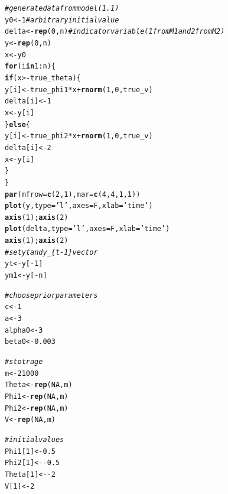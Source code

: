 \documentclass[12pt]{article}\usepackage[]{graphicx}\usepackage[]{color}
\makeatletter
\newcommand{\hlnum}[1]{\textcolor[rgb]{0.686,0.059,0.569}{#1}}%
\newcommand{\hlstr}[1]{\textcolor[rgb]{0.192,0.494,0.8}{#1}}%
\newcommand{\hlcom}[1]{\textcolor[rgb]{0.678,0.584,0.686}{\textit{#1}}}%
\newcommand{\hlopt}[1]{\textcolor[rgb]{0,0,0}{#1}}%
\newcommand{\hlstd}[1]{\textcolor[rgb]{0.345,0.345,0.345}{#1}}%
\newcommand{\hlkwa}[1]{\textcolor[rgb]{0.161,0.373,0.58}{\textbf{#1}}}%
\newcommand{\hlkwb}[1]{\textcolor[rgb]{0.69,0.353,0.396}{#1}}%
\newcommand{\hlkwc}[1]{\textcolor[rgb]{0.333,0.667,0.333}{#1}}%
\newcommand{\hlkwd}[1]{\textcolor[rgb]{0.737,0.353,0.396}{\textbf{#1}}}%
\newenvironment{kframe}{%
 \def\at@end@of@kframe{}%
 \ifinner\ifhmode%
  \def\at@end@of@kframe{\end{minipage}}%
  \begin{minipage}{\columnwidth}%
 \fi\fi%
 \def\FrameCommand##1{\hskip\@totalleftmargin \hskip-\fboxsep
 \colorbox{shadecolor}{##1}\hskip-\fboxsep
     \hskip-\linewidth \hskip-\@totalleftmargin \hskip\columnwidth}%
 \MakeFramed {\advance\hsize-\width
   \@totalleftmargin\z@ \linewidth\hsize
   \@setminipage}}%
 {\par\unskip\endMakeFramed%
 \at@end@of@kframe}
\newenvironment{knitrout}{}{} %
\makeatother
\begin{document}
\begin{knitrout}
\begin{kframe}
\begin{alltt}
\hlcom{# generate data from model (1.1)}
\hlstd{y0} \hlkwb{<-} \hlnum{1}  \hlcom{# arbitrary initial value}
\hlstd{delta} \hlkwb{<-} \hlkwd{rep}\hlstd{(}\hlnum{0}\hlstd{, n)}  \hlcom{# indicator variable (1 from M1 and 2 from M2)}
\hlstd{y} \hlkwb{<-} \hlkwd{rep}\hlstd{(}\hlnum{0}\hlstd{, n)}
\hlstd{x} \hlkwb{<-} \hlstd{y0}
\hlkwa{for} \hlstd{(i} \hlkwa{in} \hlnum{1}\hlopt{:}\hlstd{n) \{}
    \hlkwa{if} \hlstd{(x} \hlopt{> -}\hlstd{true_theta) \{}
        \hlstd{y[i]} \hlkwb{<-} \hlstd{true_phi1} \hlopt{*} \hlstd{x} \hlopt{+} \hlkwd{rnorm}\hlstd{(}\hlnum{1}\hlstd{,} \hlnum{0}\hlstd{, true_v)}
        \hlstd{delta[i]} \hlkwb{<-} \hlnum{1}
        \hlstd{x} \hlkwb{<-} \hlstd{y[i]}
    \hlstd{\}} \hlkwa{else} \hlstd{\{}
        \hlstd{y[i]} \hlkwb{<-} \hlstd{true_phi2} \hlopt{*} \hlstd{x} \hlopt{+} \hlkwd{rnorm}\hlstd{(}\hlnum{1}\hlstd{,} \hlnum{0}\hlstd{, true_v)}
        \hlstd{delta[i]} \hlkwb{<-} \hlnum{2}
        \hlstd{x} \hlkwb{<-} \hlstd{y[i]}
    \hlstd{\}}
\hlstd{\}}
\hlkwd{par}\hlstd{(}\hlkwc{mfrow} \hlstd{=} \hlkwd{c}\hlstd{(}\hlnum{2}\hlstd{,} \hlnum{1}\hlstd{),} \hlkwc{mar} \hlstd{=} \hlkwd{c}\hlstd{(}\hlnum{4}\hlstd{,} \hlnum{4}\hlstd{,} \hlnum{1}\hlstd{,} \hlnum{1}\hlstd{))}
\hlkwd{plot}\hlstd{(y,} \hlkwc{type} \hlstd{=} \hlstr{'l'}\hlstd{,} \hlkwc{axes} \hlstd{= F,} \hlkwc{xlab} \hlstd{=} \hlstr{'time'}\hlstd{)}
\hlkwd{axis}\hlstd{(}\hlnum{1}\hlstd{);} \hlkwd{axis}\hlstd{(}\hlnum{2}\hlstd{)}
\hlkwd{plot}\hlstd{(delta,} \hlkwc{type} \hlstd{=} \hlstr{'l'}\hlstd{,} \hlkwc{axes} \hlstd{= F,} \hlkwc{xlab} \hlstd{=} \hlstr{'time'}\hlstd{)}
\hlkwd{axis}\hlstd{(}\hlnum{1}\hlstd{);} \hlkwd{axis}\hlstd{(}\hlnum{2}\hlstd{)}
\hlcom{# set yt and y_\{t-1\} vector}
\hlstd{yt} \hlkwb{<-} \hlstd{y[}\hlopt{-}\hlnum{1}\hlstd{]}
\hlstd{ym1} \hlkwb{<-} \hlstd{y[}\hlopt{-}\hlstd{n]}

\hlcom{# choose prior parameters}
\hlstd{c} \hlkwb{<-} \hlnum{1}
\hlstd{a} \hlkwb{<-} \hlnum{3}
\hlstd{alpha0} \hlkwb{<-} \hlnum{3}
\hlstd{beta0} \hlkwb{<-} \hlnum{0.003}

\hlcom{# stotrage}
\hlstd{m} \hlkwb{<-} \hlnum{21000}
\hlstd{Theta} \hlkwb{<-} \hlkwd{rep}\hlstd{(}\hlnum{NA}\hlstd{, m)}
\hlstd{Phi1} \hlkwb{<-} \hlkwd{rep}\hlstd{(}\hlnum{NA}\hlstd{, m)}
\hlstd{Phi2} \hlkwb{<-} \hlkwd{rep}\hlstd{(}\hlnum{NA}\hlstd{, m)}
\hlstd{V} \hlkwb{<-} \hlkwd{rep}\hlstd{(}\hlnum{NA}\hlstd{, m)}

\hlcom{# initial values}
\hlstd{Phi1[}\hlnum{1}\hlstd{]} \hlkwb{<-} \hlnum{0.5}
\hlstd{Phi2[}\hlnum{1}\hlstd{]} \hlkwb{<-} \hlopt{-}\hlnum{0.5}
\hlstd{Theta[}\hlnum{1}\hlstd{]} \hlkwb{<-} \hlopt{-}\hlnum{2}
\hlstd{V[}\hlnum{1}\hlstd{]} \hlkwb{<-} \hlnum{2}


\end{alltt}
\end{kframe}
\end{knitrout}
\end{document}
